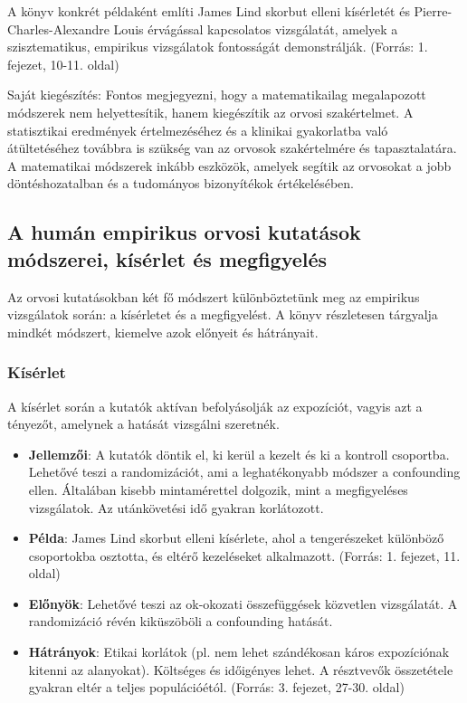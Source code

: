 \documentclass[a4paper,12pt]{article}
\begin{document}
    A könyv konkrét példaként említi James Lind skorbut elleni kísérletét és Pierre-Charles-Alexandre Louis érvágással kapcsolatos vizsgálatát, amelyek a szisztematikus, empirikus vizsgálatok fontosságát demonstrálják. (Forrás: 1. fejezet, 10-11. oldal)

    Saját kiegészítés: Fontos megjegyezni, hogy a matematikailag megalapozott módszerek nem helyettesítik, hanem kiegészítik az orvosi szakértelmet. A statisztikai eredmények értelmezéséhez és a klinikai gyakorlatba való átültetéséhez továbbra is szükség van az orvosok szakértelmére és tapasztalatára. A matematikai módszerek inkább eszközök, amelyek segítik az orvosokat a jobb döntéshozatalban és a tudományos bizonyítékok értékelésében.

    \subsection{A humán empirikus orvosi kutatások módszerei, kísérlet és megfigyelés}

    Az orvosi kutatásokban két fő módszert különböztetünk meg az empirikus vizsgálatok során: a kísérletet és a megfigyelést. A könyv részletesen tárgyalja mindkét módszert, kiemelve azok előnyeit és hátrányait.

    \subsubsection{Kísérlet}

    A kísérlet során a kutatók aktívan befolyásolják az expozíciót, vagyis azt a tényezőt, amelynek a hatását vizsgálni szeretnék.

    \begin{itemize}

        \item \textbf{Jellemzői}: A kutatók döntik el, ki kerül a kezelt és ki a kontroll csoportba. Lehetővé teszi a randomizációt, ami a leghatékonyabb módszer a confounding ellen. Általában kisebb mintamérettel dolgozik, mint a megfigyeléses vizsgálatok. Az utánkövetési idő gyakran korlátozott.

        \item \textbf{Példa}: James Lind skorbut elleni kísérlete, ahol a tengerészeket különböző csoportokba osztotta, és eltérő kezeléseket alkalmazott. (Forrás: 1. fejezet, 11. oldal)

        \item \textbf{Előnyök}: Lehetővé teszi az ok-okozati összefüggések közvetlen vizsgálatát.
        A randomizáció révén kiküszöböli a confounding hatását.

        \item \textbf{Hátrányok}: Etikai korlátok (pl. nem lehet szándékosan káros expozíciónak kitenni az alanyokat).
        Költséges és időigényes lehet.
        A résztvevők összetétele gyakran eltér a teljes populációétól. (Forrás: 3. fejezet, 27-30. oldal)

    \end{itemize}
\end{document}
